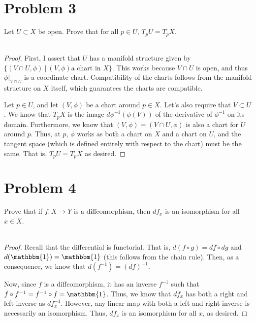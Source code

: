 \documentclass[fontsize=11pt]{scrartcl} %
\numberwithin{equation}{section} %
\numberwithin{figure}{section} %
\numberwithin{table}{section} %
\begin{document}
\newpage

\section*{Problem 3}
Let $U\subset X$ be open. Prove that for all $p\in U$, $T_pU = T_pX$.
\\
\\
\begin{proof}
    First, I assert that $U$ has a manifold structure given by $\{(V\cap
    U,\phi)\ |\ (V,\phi) \text{a chart in $X$}\}$. This works because $V\cap U$
    is open, and thus $\phi|_{V\cap U}$ is a coordinate chart. Compatibility of
    the charts follows from the manifold structure on $X$ itself, which
    guarantees the charts are compatible.

    Let $p\in U$, and let $(V,\phi)$ be a chart around $p\in X$. Let's also
    require that $V\subset U$. We know that
    $T_pX$ is the image $d\phi^{-1}(\phi(V))$ of the derivative of $\phi^{-1}$
    on its domain. Furthermore, we know that $(V,\phi) = (V\cap U,\phi)$ is also
    a chart for $U$ around $p$. Thus, at $p$, $\phi$ works as both a chart on
    $X$ and a chart on $U$, and the tangent space (which is defined entirely
    with respect to the chart) must be the same. That is, $T_pU = T_pX$ as
    desired.
\end{proof}

\newpage

\section*{Problem 4}
Prove that if $f:X\to Y$ is a diffeomorphism, then $df_x$ is an isomorphism for
all $x\in X$.
\\
\\
\begin{proof}
    Recall that the differential is functorial. That is, $d(f\circ g) = df\circ
    dg$ and $d(\mathbbm{1}) = \mathbbm{1}$ (this follows from the chain rule).
    Then, as a consequence, we know that $d(f^{-1}) = (df)^{-1}$.

    Now, since $f$ is a diffeomorphism, it has an inverse $f^{-1}$ such that
    $f\circ f^{-1} = f^{-1}\circ f = \mathbbm{1}$.
    Thus, we know that $df_x$ has both a right and left inverse as $df^{-1}_x$.
    However, any linear map with both a left and right inverse is necessarily an
    isomorphism. Thus, $df_x$ is an isomorphism for all $x$, as desired.
\end{proof}
\end{document}
